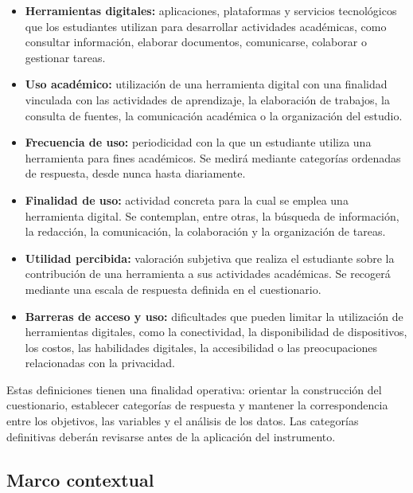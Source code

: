 \begin{itemize}
    \item \textbf{Herramientas digitales:} aplicaciones, plataformas y servicios tecnológicos que los estudiantes utilizan para desarrollar actividades académicas, como consultar información, elaborar documentos, comunicarse, colaborar o gestionar tareas.

    \item \textbf{Uso académico:} utilización de una herramienta digital con una finalidad vinculada con las actividades de aprendizaje, la elaboración de trabajos, la consulta de fuentes, la comunicación académica o la organización del estudio.

    \item \textbf{Frecuencia de uso:} periodicidad con la que un estudiante utiliza una herramienta para fines académicos. Se medirá mediante categorías ordenadas de respuesta, desde nunca hasta diariamente.

    \item \textbf{Finalidad de uso:} actividad concreta para la cual se emplea una herramienta digital. Se contemplan, entre otras, la búsqueda de información, la redacción, la comunicación, la colaboración y la organización de tareas.

    \item \textbf{Utilidad percibida:} valoración subjetiva que realiza el estudiante sobre la contribución de una herramienta a sus actividades académicas. Se recogerá mediante una escala de respuesta definida en el cuestionario.

    \item \textbf{Barreras de acceso y uso:} dificultades que pueden limitar la utilización de herramientas digitales, como la conectividad, la disponibilidad de dispositivos, los costos, las habilidades digitales, la accesibilidad o las preocupaciones relacionadas con la privacidad.
\end{itemize}

Estas definiciones tienen una finalidad operativa: orientar la construcción del cuestionario, establecer categorías de respuesta y mantener la correspondencia entre los objetivos, las variables y el análisis de los datos. Las categorías definitivas deberán revisarse antes de la aplicación del instrumento.

\subsection{Marco contextual}

